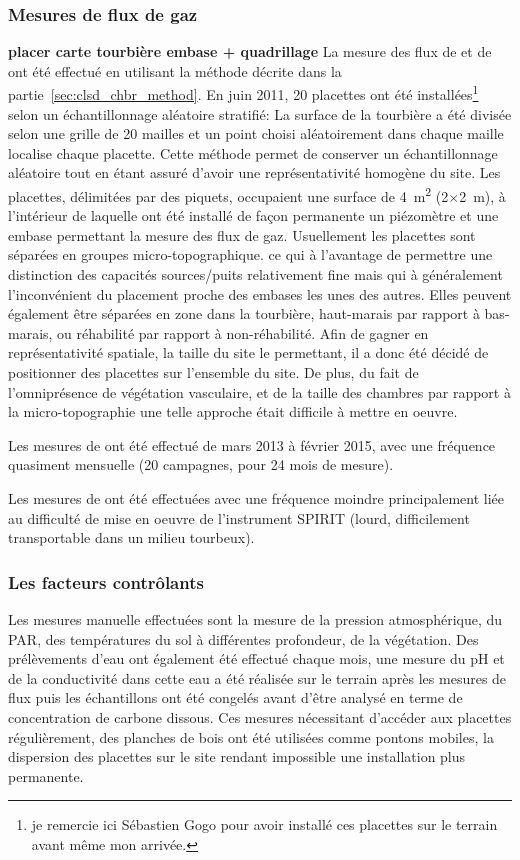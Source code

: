 \subsubsection{Mesures de flux de gaz}
\textbf{placer carte tourbière embase + quadrillage}
La mesure des flux de \coo et de \chh ont été effectué en utilisant la méthode décrite dans la partie~\ref{sec:clsd_chbr_method}.
En juin 2011, 20 placettes ont été installées\footnote{je remercie ici Sébastien Gogo pour avoir installé ces placettes sur le terrain avant même mon arrivée.} selon un échantillonnage aléatoire stratifié:
La surface de la tourbière a été divisée selon une grille de 20 mailles et un point choisi aléatoirement dans chaque maille localise chaque placette.
Cette méthode permet de conserver un échantillonnage aléatoire tout en étant assuré d'avoir une représentativité homogène du site. 
Les placettes, délimitées par des piquets, occupaient une surface de \SI{4}{\square\metre} (2$\times$\SI{2}{\metre}), à l'intérieur de laquelle ont été installé de façon permanente un piézomètre et une embase permettant la mesure des flux de gaz.
Usuellement les placettes sont séparées en groupes micro-topographique. ce qui à l'avantage de permettre une distinction des capacités sources/puits relativement fine mais qui à généralement l'inconvénient du placement proche des embases les unes des autres.
Elles peuvent également être séparées en zone dans la tourbière, haut-marais par rapport à bas-marais, ou réhabilité par rapport à non-réhabilité.
Afin de gagner en représentativité spatiale, la taille du site le permettant, il a donc été décidé de positionner des placettes sur l'ensemble du site.
De plus, du fait de l'omniprésence de végétation vasculaire, et de la taille des chambres par rapport à la micro-topographie une telle approche était difficile à mettre en oeuvre.

Les mesures de \coo ont été effectué de mars 2013 à février 2015, avec une fréquence quasiment mensuelle (20 campagnes, pour 24 mois de mesure).

Les mesures de \chh ont été effectuées avec une fréquence moindre principalement liée au difficulté de mise en oeuvre de l'instrument SPIRIT (lourd, difficilement transportable dans un milieu tourbeux).

\subsubsection{Les facteurs contrôlants}

Les mesures manuelle effectuées sont la mesure de la pression atmosphérique, du PAR, des températures du sol à différentes profondeur, de la végétation.
Des prélèvements d'eau ont également été effectué chaque mois, une mesure du pH et de la conductivité dans cette eau a été réalisée sur le terrain après les mesures de flux puis les échantillons ont été congelés avant d'être analysé en terme de concentration de carbone dissous.
Ces mesures nécessitant d'accéder aux placettes régulièrement, des planches de bois ont été utilisées comme pontons mobiles, la dispersion des placettes sur le site rendant impossible une installation plus permanente.

